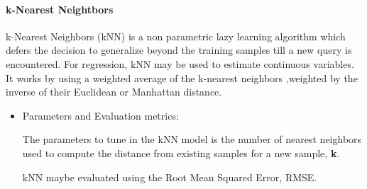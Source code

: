 \documentclass[letterpaper,12pt,titlepage,oneside,final]{report}
\begin{document}
                \paragraph{k-Nearest Neightbors}
                    k-Nearest Neighbors (kNN) is a non parametric lazy learning algorithm which defers the decision to generalize beyond the training samples till a new query is encountered. For regression, kNN may be used to estimate continuous variables. It works by using a weighted average of the k-nearest neighbors ,weighted by the inverse of their Euclidean or Manhattan distance.
                    \begin{itemize}

                    \item{Parameters and Evaluation metrics:} %

                        The parameters to tune in the kNN model is the number of nearest neighbors used to compute the distance from existing samples for a new sample, \textbf{k}.

                        kNN maybe evaluated using the Root Mean Squared Error, RMSE.
                    
                    \end{itemize}
\end{document}
